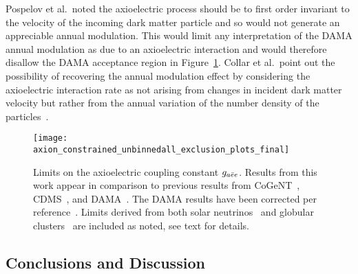 	Pospelov et al.~noted the axioelectric process should be to first order invariant to the velocity of the incoming dark matter particle and so would not generate an appreciable annual modulation.  This would limit any interpretation of the DAMA annual modulation as due to an axioelectric interaction and would therefore disallow the DAMA acceptance region in Figure~\ref{fig:HeavyAxionLimits}.  Collar et al.~point out the possibility of recovering the annual modulation effect by considering the axioelectric interaction rate as not arising from changes in incident dark matter velocity but rather from the annual variation of the number density of the particles~\cite{Collar:2009sp}. 
			
		\begin{figure}
			\centering
			\texttt{[image: axion\_constrained\_unbinnedall\_exclusion\_plots\_final]}
			\caption[Limits on the axioelectric coupling constant $\gaa$]{Limits on the axioelectric 
			coupling constant $\gaa$.  Results from this work appear in comparison to previous 
			results from CoGeNT~\cite{Aalseth:2008aa}, CDMS~\cite{Ahmed2009}, and 
			DAMA~\cite{Bernabei:2005ca}.  The DAMA results have been corrected per 
			reference~\cite{Collar:2009sp}.  Limits derived from both solar neutrinos~\cite{Gondolo09} and globular clusters~\cite{Raffelt95} are included as noted, see text for details.}
			\label{fig:HeavyAxionLimits}
		\end{figure}
		
	\subsection{Conclusions and Discussion}
	\label{sec:DiscOnHeavyAxionLimits}	

	
